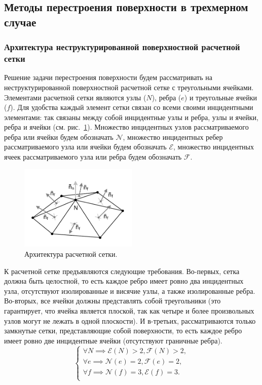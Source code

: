 \subsection{Методы перестроения поверхности в трехмерном случае}

\subsubsection{Архитектура неструктурированной поверхностной расчетной сетки}

Решение задачи перестроения поверхности будем рассматривать на неструктурированной поверхностной расчетной сетке с треугольными ячейками.
Элементами расчетной сетки являются узлы ($N$), ребра ($e$) и треугольные ячейки ($f$).
Для удобства каждый элемент сетки связан со всеми своими инцидентными элементами: так связаны между собой инцидентные узлы и ребра, узлы и ячейки, ребра и ячейки (см. рис.~\ref{fig:text_1_remesh3_architecture}).
Множество инцидентных узлов рассматриваемого ребра или ячейки будем обозначать $\mathscr{N}$, множество инцидентных ребер рассматриваемого узла или ячейки будем обозначать $\mathscr{E}$, множество инцидентных ячеек рассматриваемого узла или ребра будем обозначать $\mathscr{F}$.

\begin{figure}[ht]
\centering
\includegraphics[width=0.5\textwidth]{pics/text_1_remesh_3d/pic_architecture.pdf}
\caption{Архитектура расчетной сетки.}
\label{fig:text_1_remesh3_architecture}
\end{figure}

К расчетной сетке предъявляются следующие требования.
Во-первых, сетка должна быть целостной, то есть каждое ребро имеет ровно два инцидентных узла, отсутствуют изолированные и висячие узлы, а также изолированные ребра.
Во-вторых, все ячейки должны представлять собой треугольники (это гарантирует, что ячейка является плоской, так как четыре и более произвольных узлов могут не лежать в одной плоскости).
И в-третьих, рассматриваются только замкнутые сетки, представляющие собой поверхности, то есть каждое ребро имеет ровно две инцидентные ячейки (отсутствуют граничные ребра).
\begin{equation}\label{eqn:text_1_remesh3_arch}
\begin{cases}
\forall N \implies \mathscr{E}(N) > 2, \mathscr{F}(N) > 2, \\
\forall e \implies \mathscr{N}(e) = 2 , \mathscr{F}(e) = 2, \\
\forall f \implies \mathscr{N}(f) = 3 , \mathscr{E}(f) = 3. \\
\end{cases}
\end{equation}


